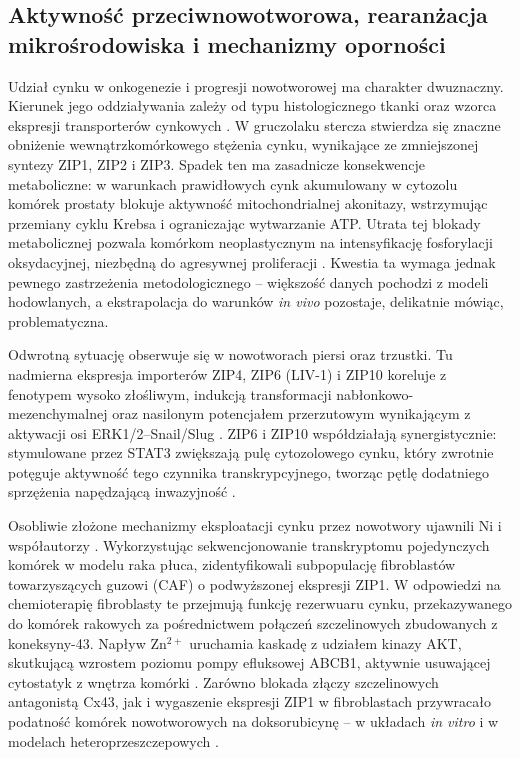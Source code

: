 \documentclass[12pt,a4paper]{article}
\begin{document}
\subsection{Aktywność przeciwnowotworowa, rearanżacja mikrośrodowiska i mechanizmy oporności}

Udział cynku w onkogenezie i progresji nowotworowej ma charakter dwuznaczny. Kierunek jego oddziaływania zależy od typu histologicznego tkanki oraz wzorca ekspresji transporterów cynkowych \cite{bafaro2017}. W gruczolaku stercza stwierdza się znaczne obniżenie wewnątrzkomórkowego stężenia cynku, wynikające ze zmniejszonej syntezy ZIP1, ZIP2 i ZIP3. Spadek ten ma zasadnicze konsekwencje metaboliczne: w warunkach prawidłowych cynk akumulowany w cytozolu komórek prostaty blokuje aktywność mitochondrialnej akonitazy, wstrzymując przemiany cyklu Krebsa i ograniczając wytwarzanie ATP. Utrata tej blokady metabolicznej pozwala komórkom neoplastycznym na intensyfikację fosforylacji oksydacyjnej, niezbędną do agresywnej proliferacji \cite{bafaro2017}. Kwestia ta wymaga jednak pewnego zastrzeżenia metodologicznego -- większość danych pochodzi z modeli hodowlanych, a ekstrapolacja do warunków \textit{in vivo} pozostaje, delikatnie mówiąc, problematyczna.

Odwrotną sytuację obserwuje się w nowotworach piersi oraz trzustki. Tu nadmierna ekspresja importerów ZIP4, ZIP6 (LIV-1) i ZIP10 koreluje z fenotypem wysoko złośliwym, indukcją transformacji nabłonkowo-mezenchymalnej oraz nasilonym potencjałem przerzutowym wynikającym z aktywacji osi ERK1/2--Snail/Slug \cite{bafaro2017}. ZIP6 i ZIP10 współdziałają synergistycznie: stymulowane przez STAT3 zwiększają pulę cytozolowego cynku, który zwrotnie potęguje aktywność tego czynnika transkrypcyjnego, tworząc pętlę dodatniego sprzężenia napędzającą inwazyjność \cite{bafaro2017, chen2024}.

Osobliwie złożone mechanizmy eksploatacji cynku przez nowotwory ujawnili Ni i współautorzy \cite{ni2022}. Wykorzystując sekwencjonowanie transkryptomu pojedynczych komórek w modelu raka płuca, zidentyfikowali subpopulację fibroblastów towarzyszących guzowi (CAF) o podwyższonej ekspresji ZIP1. W odpowiedzi na chemioterapię fibroblasty te przejmują funkcję rezerwuaru cynku, przekazywanego do komórek rakowych za pośrednictwem połączeń szczelinowych zbudowanych z koneksyny-43. Napływ Zn\(^{2+}\) uruchamia kaskadę z udziałem kinazy AKT, skutkującą wzrostem poziomu pompy efluksowej ABCB1, aktywnie usuwającej cytostatyk z wnętrza komórki \cite{ni2022}. Zarówno blokada złączy szczelinowych antagonistą Cx43, jak i wygaszenie ekspresji ZIP1 w fibroblastach przywracało podatność komórek nowotworowych na doksorubicynę -- w układach \textit{in vitro} i w modelach heteroprzeszczepowych \cite{ni2022}.
\end{document}
